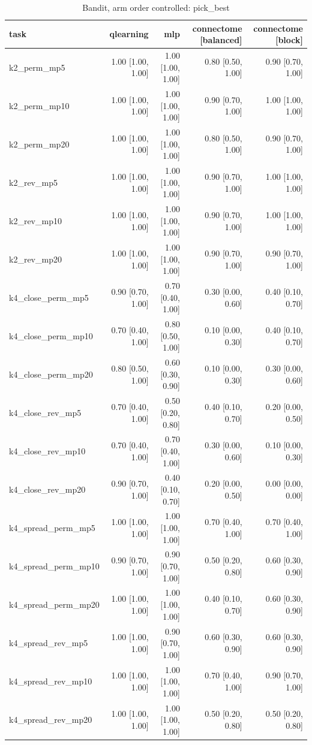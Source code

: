 \begin{table}[t]
\centering
\small
\begin{tabular}{lrrrr}
\toprule
task & qlearning & mlp & connectome [balanced] & connectome [block] \\
\midrule
k2\_perm\_mp5 & 1.00 [1.00, 1.00] & 1.00 [1.00, 1.00] & 0.80 [0.50, 1.00] & 0.90 [0.70, 1.00] \\
k2\_perm\_mp10 & 1.00 [1.00, 1.00] & 1.00 [1.00, 1.00] & 0.90 [0.70, 1.00] & 1.00 [1.00, 1.00] \\
k2\_perm\_mp20 & 1.00 [1.00, 1.00] & 1.00 [1.00, 1.00] & 0.80 [0.50, 1.00] & 0.90 [0.70, 1.00] \\
k2\_rev\_mp5 & 1.00 [1.00, 1.00] & 1.00 [1.00, 1.00] & 0.90 [0.70, 1.00] & 1.00 [1.00, 1.00] \\
k2\_rev\_mp10 & 1.00 [1.00, 1.00] & 1.00 [1.00, 1.00] & 0.90 [0.70, 1.00] & 1.00 [1.00, 1.00] \\
k2\_rev\_mp20 & 1.00 [1.00, 1.00] & 1.00 [1.00, 1.00] & 0.90 [0.70, 1.00] & 0.90 [0.70, 1.00] \\
k4\_close\_perm\_mp5 & 0.90 [0.70, 1.00] & 0.70 [0.40, 1.00] & 0.30 [0.00, 0.60] & 0.40 [0.10, 0.70] \\
k4\_close\_perm\_mp10 & 0.70 [0.40, 1.00] & 0.80 [0.50, 1.00] & 0.10 [0.00, 0.30] & 0.40 [0.10, 0.70] \\
k4\_close\_perm\_mp20 & 0.80 [0.50, 1.00] & 0.60 [0.30, 0.90] & 0.10 [0.00, 0.30] & 0.30 [0.00, 0.60] \\
k4\_close\_rev\_mp5 & 0.70 [0.40, 1.00] & 0.50 [0.20, 0.80] & 0.40 [0.10, 0.70] & 0.20 [0.00, 0.50] \\
k4\_close\_rev\_mp10 & 0.70 [0.40, 1.00] & 0.70 [0.40, 1.00] & 0.30 [0.00, 0.60] & 0.10 [0.00, 0.30] \\
k4\_close\_rev\_mp20 & 0.90 [0.70, 1.00] & 0.40 [0.10, 0.70] & 0.20 [0.00, 0.50] & 0.00 [0.00, 0.00] \\
k4\_spread\_perm\_mp5 & 1.00 [1.00, 1.00] & 1.00 [1.00, 1.00] & 0.70 [0.40, 1.00] & 0.70 [0.40, 1.00] \\
k4\_spread\_perm\_mp10 & 0.90 [0.70, 1.00] & 0.90 [0.70, 1.00] & 0.50 [0.20, 0.80] & 0.60 [0.30, 0.90] \\
k4\_spread\_perm\_mp20 & 1.00 [1.00, 1.00] & 1.00 [1.00, 1.00] & 0.40 [0.10, 0.70] & 0.60 [0.30, 0.90] \\
k4\_spread\_rev\_mp5 & 1.00 [1.00, 1.00] & 0.90 [0.70, 1.00] & 0.60 [0.30, 0.90] & 0.60 [0.30, 0.90] \\
k4\_spread\_rev\_mp10 & 1.00 [1.00, 1.00] & 1.00 [1.00, 1.00] & 0.70 [0.40, 1.00] & 0.90 [0.70, 1.00] \\
k4\_spread\_rev\_mp20 & 1.00 [1.00, 1.00] & 1.00 [1.00, 1.00] & 0.50 [0.20, 0.80] & 0.50 [0.20, 0.80] \\
\bottomrule
\end{tabular}
\caption{Bandit, arm order controlled: pick\_best}
\label{tab:bandit_perm_pick_best}
\end{table}